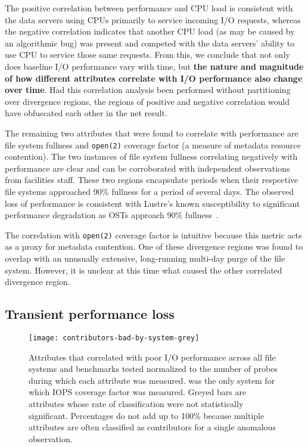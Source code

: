 The positive correlation between performance and CPU load is consistent with the data servers using CPUs primarily to service incoming I/O requests, whereas the negative correlation indicates that another CPU load (as may be caused by an algorithmic bug) was present and competed with the data servers' ability to use CPU to service those same requests.
From this, we conclude that not only does baseline I/O performance vary with time, but \textbf{the nature and magnitude of how different attributes correlate with I/O performance also change over time}.
Had this correlation analysis been performed without partitioning over divergence regions, the regions of positive and negative correlation would have obfuscated each other in the net result.

The remaining two attributes that were found to correlate with performance
are file system fullness and \texttt{open(2)} coverage factor (a
measure of metadata resource contention).  The two instances of file
system fullness correlating negatively with performance are clear
and can be corroborated with independent observations from facilities
staff.  These two regions encapsulate periods when their respective
file systems approached 90\% fullness for a period of several days.
The observed loss of performance is consistent with Lustre's known
susceptibility to significant performance degradation as OSTs approach
90\% fullness~\cite{oral2014best,Lockwood2017}.

The correlation with
\texttt{open(2)} coverage factor is intuitive because this metric acts as a
proxy for metadata contention.  
One of these divergence regions was found to overlap with an unusually extensive, long-running multi-day purge of the \edison \scratchtwo file system.
However, it is unclear at this time what caused the other correlated divergence region.


\subsection{Transient performance loss} \label{sec:results/shortterm}

\begin{figure}

    \centering
    \texttt{[image: contributors-bad-by-system-grey]}
    \vspace{-.35in}
    \caption{Attributes that correlated with poor I/O performance across all file systems and benchmarks tested normalized to the number of probes during which each attribute was measured.
    \mira was the only system for which IOPS coverage factor was measured.
    Greyed bars are attributes whose rate of classification were not statistically significant.
    Percentages do not add up to 100\% because multiple attributes are often classified as contributors for a single anomalous observation.
    }
    \label{fig:contributors-bad-by-system}
\end{figure}

